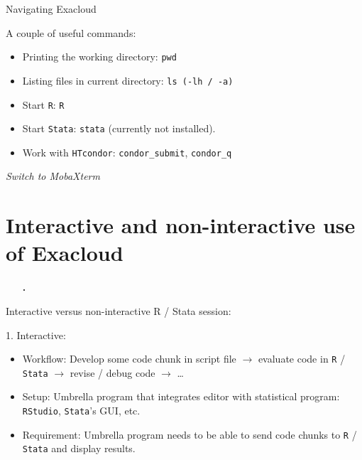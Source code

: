 \documentclass[12pt,t,xcolor=table]{beamer}
\begin{document}
\begin{frame}[fragile,label={sec:orgheadline11}]{Navigating Exacloud}
 \vspace{0.5em}

A couple of useful commands:\setlength\itemsep{0.5em}

\begin{itemize}
\item Printing the working directory: \texttt{pwd}

\item Listing files in current directory: \texttt{ls (-lh / -a)}

\item Start \texttt{R}: \texttt{R}

\item Start \texttt{Stata}: \texttt{stata} (currently not installed).

\item Work with \texttt{HTcondor}: \texttt{condor\_submit}, \texttt{condor\_q}
\end{itemize}


\vspace{1em}

\emph{Switch to MobaXterm}
\end{frame}

\section{Interactive and non-interactive use of Exacloud}
\label{sec:orgheadline23}
\begin{frame}[c]{}
  \begin{itemize}
    \item[\bf\thesection.] \bf\insertsection
  \end{itemize}          
\end{frame}

\begin{frame}[fragile,label={sec:orgheadline13}]{Interactive versus non-interactive R / Stata session:}
 \begin{block}{1. Interactive:}
\begin{itemize}
\item Workflow: Develop some code chunk in script file \(\rightarrow\) evaluate code in \texttt{R} / \texttt{Stata} \(\rightarrow\) revise / debug code \(\rightarrow\) \ldots{} \setlength\itemsep{0.5em}\vspace{-1.0em}

\item Setup: Umbrella program that integrates editor with statistical program: \texttt{RStudio}, \texttt{Stata}'s GUI, etc.

\item Requirement: Umbrella program needs to be able to send code chunks to \texttt{R} / \texttt{Stata} and display results.
\end{itemize}
\end{block}
\end{frame}
\end{document}
